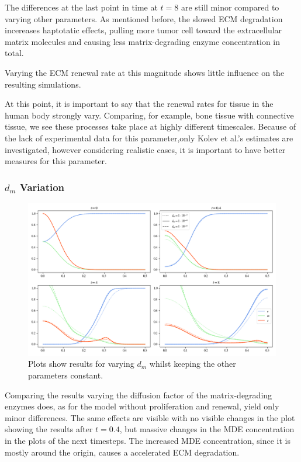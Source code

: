 The differences at the last point in time at $t=8$ are still minor compared to varying other parameters. As mentioned before, the slowed ECM degradation incereases haptotatic effects, pulling more tumor cell toward the extracellular matrix molecules and causing less matrix-degrading enzyme concentration in total.

Varying the ECM renewal rate at this magnitude shows little influence on the resulting simulations.
 
At this point, it is important to say that the renewal rates for tissue in the human body strongly vary. Comparing, for example, bone tissue with connective tissue, we see these processes take place at highly different timescales. Because of the lack of experimental data for this parameter,only Kolev et al.'s estimates are investigated, however considering realistic cases, it is important to have better measures for this parameter.

\subsubsection*{$d_m$ Variation}
\begin{figure}[h!]
    \centering
    \includegraphics[width=\textwidth]{resources/images/prolif_dm_variation.png}
    \caption{Plots show results for varying $d_m$ whilst keeping the other parameters constant.}
    \label{fig:prolif_dm_variation}
\end{figure}

Comparing the results varying the diffusion factor of the matrix-degrading enzymes does, as for the model without proliferation and renewal, yield only minor differences. The same effects are visible with no visible changes in the plot showing the results after $t=0.4$, but massive changes in the MDE concentration in the plots of the next timesteps. The increased MDE concentration, since it is mostly around the origin, causes a accelerated ECM degradation.

